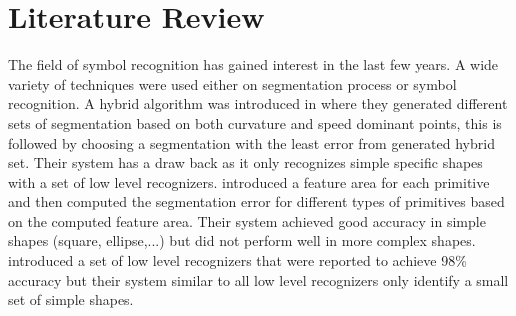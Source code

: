 \documentclass[a4paper,10pt]{IEEEconf}
\begin{document}
\section{Literature Review}
\label{Sec:RelatedWork}
The field of symbol recognition has gained interest in the last few years. A wide variety of techniques were used either on segmentation process or symbol recognition.
A hybrid algorithm was introduced in \cite{earlyprocess} where they generated different sets of segmentation based on both curvature and speed dominant points, this is followed by choosing a segmentation with the least error from generated hybrid set. Their system has a draw back as it only recognizes simple specific shapes with a set of low level recognizers. \citeauthor{meanshift10} introduced a feature area for each primitive and then computed the segmentation error for different types of primitives based on the computed feature area. Their system achieved good accuracy in simple shapes (square, ellipse,...) but did not perform well in more complex shapes\cite{meanshift10}. \citeauthor{Paleosketch08} \cite{Paleosketch08} introduced a set of low level recognizers that were reported to achieve 98\%  accuracy but their system similar to all low level recognizers only identify a small set of simple shapes. 

\end{document}
